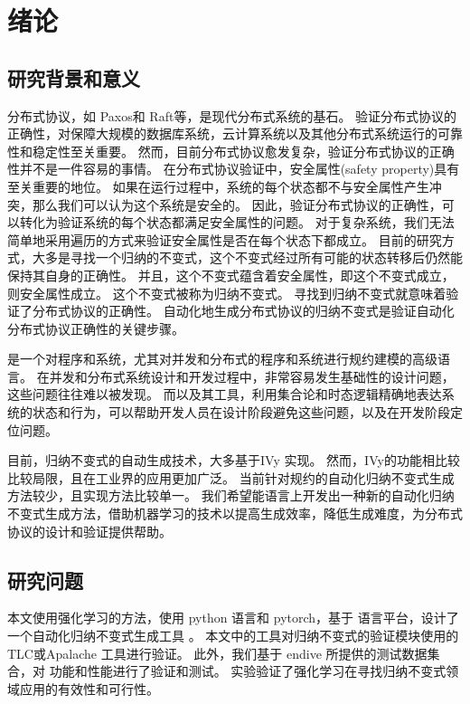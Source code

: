 \chapter{绪论}\label{chap:introduction}

\section{研究背景和意义}
分布式协议，如 Paxos和 Raft等，是现代分布式系统的基石。
验证分布式协议的正确性，对保障大规模的数据库系统，云计算系统以及其他分布式系统运行的可靠性和稳定性至关重要。
然而，目前分布式协议愈发复杂，验证分布式协议的正确性并不是一件容易的事情。
在分布式协议验证中，安全属性(safety property)具有至关重要的地位。
如果在运行过程中，系统的每个状态都不与安全属性产生冲突，那么我们可以认为这个系统是安全的。
因此，验证分布式协议的正确性，可以转化为验证系统的每个状态都满足安全属性的问题。
对于复杂系统，我们无法简单地采用遍历的方式来验证安全属性是否在每个状态下都成立。
目前的研究方式，大多是寻找一个归纳的不变式，这个不变式经过所有可能的状态转移后仍然能保持其自身的正确性。
并且，这个不变式蕴含着安全属性，即这个不变式成立，则安全属性成立。
这个不变式被称为归纳不变式\cite{inductive}。
寻找到归纳不变式就意味着验证了分布式协议的正确性。\cite{towards}
自动化地生成分布式协议的归纳不变式是验证自动化分布式协议正确性的关键步骤。

\TLA \cite{TLA+}是一个对程序和系统，尤其对并发和分布式的程序和系统进行规约建模的高级语言。
在并发和分布式系统设计和开发过程中，非常容易发生基础性的设计问题，这些问题往往难以被发现。
而\TLA 以及其工具，利用集合论和时态逻辑精确地表达系统的状态和行为，可以帮助开发人员在设计阶段避免这些问题，以及在开发阶段定位问题。

目前，归纳不变式的自动生成技术，大多基于IVy \cite{Ivy} 实现。
然而，IVy的功能相比较\TLA 比较局限，且\TLA 在工业界的应用更加广泛。
当前针对\TLA 规约的自动化归纳不变式生成方法较少，且实现方法比较单一。
我们希望能\TLA 语言上开发出一种新的自动化归纳不变式生成方法，借助机器学习的技术以提高生成效率，降低生成难度，为分布式协议的设计和验证提供帮助。

\section{研究问题}
本文使用强化学习的方法，使用 python 语言和 pytorch，基于 \TLA 语言平台，设计了一个自动化归纳不变式生成工具 \rltla。
本文中的工具对归纳不变式的验证模块使用的 TLC或Apalache 工具进行验证。
此外，我们基于 endive 所提供的测试数据集合，对 \rltla 功能和性能进行了验证和测试。
实验验证了强化学习在寻找归纳不变式领域应用的有效性和可行性。

